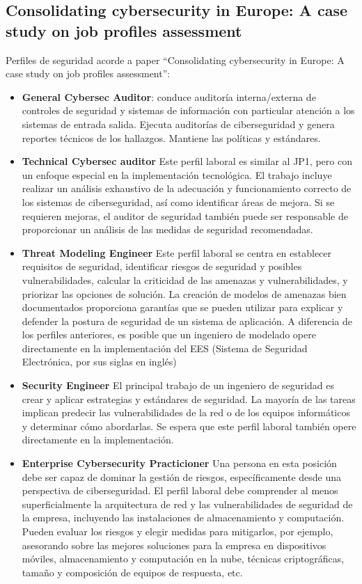 \subsection{Consolidating cybersecurity in Europe: A case study on job profiles assessment}
Perfiles de seguridad acorde a paper ``Consolidating cybersecurity in Europe: A case study on job profiles assessment'':

\begin{itemize}

\item \textbf{General Cybersec Auditor}:	conduce auditoría interna/externa de controles de seguridad y sistemas de información con particular atención a los sistemas de entrada salida. Ejecuta auditorías de ciberseguridad y genera reportes técnicos de los hallazgos. Mantiene las políticas y estándares.	
\item \textbf{Technical Cybersec auditor}	Este perfil laboral es similar al JP1, pero con un enfoque especial en la implementación tecnológica. El trabajo incluye realizar un análisis exhaustivo de la adecuación y funcionamiento correcto de los sistemas de ciberseguridad, así como identificar áreas de mejora. Si se requieren mejoras, el auditor de seguridad también puede ser responsable de proporcionar un análisis de las medidas de seguridad recomendadas.	
\item \textbf{Threat Modeling Engineer}	Este perfil laboral se centra en establecer requisitos de seguridad, identificar riesgos de seguridad y posibles vulnerabilidades, calcular la criticidad de las amenazas y vulnerabilidades, y priorizar las opciones de solución. La creación de modelos de amenazas bien documentados proporciona garantías que se pueden utilizar para explicar y defender la postura de seguridad de un sistema de aplicación. A diferencia de los perfiles anteriores, es posible que un ingeniero de modelado opere directamente en la implementación del EES (Sistema de Seguridad Electrónica, por sus siglas en inglés)	
\item \textbf{Security Engineer}	El principal trabajo de un ingeniero de seguridad es crear y aplicar estrategias y estándares de seguridad. La mayoría de las tareas implican predecir las vulnerabilidades de la red o de los equipos informáticos y determinar cómo abordarlas. Se espera que este perfil laboral también opere directamente en la implementación.	
\item \textbf{Enterprise Cybersecurity Practicioner}	Una persona en esta posición debe ser capaz de dominar la gestión de riesgos, específicamente desde una perspectiva de ciberseguridad. El perfil laboral debe comprender al menos superficialmente la arquitectura de red y las vulnerabilidades de seguridad de la empresa, incluyendo las instalaciones de almacenamiento y computación. Pueden evaluar los riesgos y elegir medidas para mitigarlos, por ejemplo, asesorando sobre las mejores soluciones para la empresa en dispositivos móviles, almacenamiento y computación en la nube, técnicas criptográficas, tamaño y composición de equipos de respuesta, etc.	

\end{itemize}
